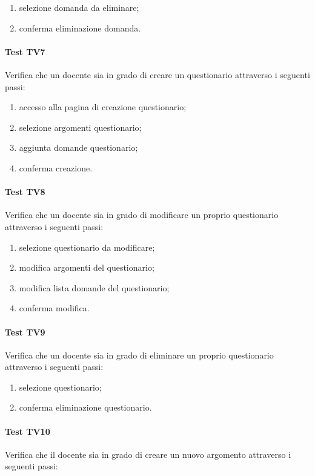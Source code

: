 \documentclass[12pt,a4paper]{article}
\begin{document}
	\begin{enumerate}
		\item selezione domanda da eliminare;
		\item conferma eliminazione domanda.
	\end{enumerate}
	\hypertarget{TV7}{}
	\paragraph{Test TV7}
	Verifica che un docente sia in grado di creare un questionario attraverso i seguenti passi:
	
	\begin{enumerate}
		\item accesso alla pagina di creazione questionario;
		\item selezione argomenti questionario;
		\item aggiunta domande questionario;
		\item conferma creazione.
	\end{enumerate}
	\hypertarget{TV8}{}
	\paragraph{Test TV8}
	Verifica che un docente sia in grado di modificare un proprio questionario attraverso i seguenti passi:
	
	\begin{enumerate}
		\item selezione questionario da modificare;
		\item modifica argomenti del questionario;
		\item modifica lista domande del questionario;
		\item conferma modifica.
	\end{enumerate}
	\hypertarget{TV9}{}
	\paragraph{Test TV9}
	Verifica che un docente sia in grado di eliminare un proprio questionario attraverso i seguenti passi:
	
	\begin{enumerate}
		\item selezione questionario;
		\item conferma eliminazione questionario.
	\end{enumerate}
	\hypertarget{TV10}{}
	\paragraph{Test TV10}
	Verifica che il docente sia in grado di creare un nuovo argomento attraverso i seguenti passi:
	
\end{document}

